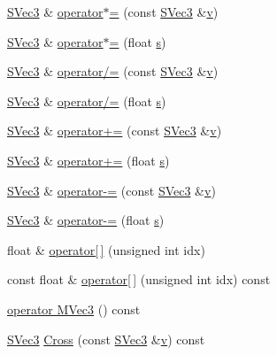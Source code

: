 \begin{CompactItemize}
\hyperlink{struct_s_vec3}{SVec3} \& \hyperlink{struct_s_vec3_4a1d77dd549c58455c0003e1445d1ad3}{operator$\ast$=} (const \hyperlink{struct_s_vec3}{SVec3} \&\hyperlink{struct_s_vec3_e77f7ec6dd4b23199dce3e4dfaee9804}{v})
\item 
\hyperlink{struct_s_vec3}{SVec3} \& \hyperlink{struct_s_vec3_eb70adcdab8bd8aa9351db18341ef6e0}{operator$\ast$=} (float \hyperlink{glext__bak_8h_d585a1393cfa368fa9dc3d8ebff640d5}{s})
\item 
\hyperlink{struct_s_vec3}{SVec3} \& \hyperlink{struct_s_vec3_9e47ed7dcdb8436f298025c3cdc8f75a}{operator/=} (const \hyperlink{struct_s_vec3}{SVec3} \&\hyperlink{struct_s_vec3_e77f7ec6dd4b23199dce3e4dfaee9804}{v})
\item 
\hyperlink{struct_s_vec3}{SVec3} \& \hyperlink{struct_s_vec3_270fb17ebc3651f2761e9ddd294e9e2d}{operator/=} (float \hyperlink{glext__bak_8h_d585a1393cfa368fa9dc3d8ebff640d5}{s})
\item 
\hyperlink{struct_s_vec3}{SVec3} \& \hyperlink{struct_s_vec3_1b2eb0d4a1f7616b3cbf3174fe4a7bcc}{operator+=} (const \hyperlink{struct_s_vec3}{SVec3} \&\hyperlink{struct_s_vec3_e77f7ec6dd4b23199dce3e4dfaee9804}{v})
\item 
\hyperlink{struct_s_vec3}{SVec3} \& \hyperlink{struct_s_vec3_907316ea6880e4b6c5816929d8f387f3}{operator+=} (float \hyperlink{glext__bak_8h_d585a1393cfa368fa9dc3d8ebff640d5}{s})
\item 
\hyperlink{struct_s_vec3}{SVec3} \& \hyperlink{struct_s_vec3_3927705cbbdba6a42b8ec8bd839b1528}{operator-=} (const \hyperlink{struct_s_vec3}{SVec3} \&\hyperlink{struct_s_vec3_e77f7ec6dd4b23199dce3e4dfaee9804}{v})
\item 
\hyperlink{struct_s_vec3}{SVec3} \& \hyperlink{struct_s_vec3_eeb11a8159ee71312203d2bab8f7c157}{operator-=} (float \hyperlink{glext__bak_8h_d585a1393cfa368fa9dc3d8ebff640d5}{s})
\item 
float \& \hyperlink{struct_s_vec3_80054be7f9f62d81c5612d69f32ba11c}{operator\mbox{[}$\,$\mbox{]}} (unsigned int idx)
\item 
const float \& \hyperlink{struct_s_vec3_200414903bec9b6bab6946b0d900dc40}{operator\mbox{[}$\,$\mbox{]}} (unsigned int idx) const 
\item 
\hyperlink{struct_s_vec3_feb6cc5887cb360146ca4add14f935dc}{operator MVec3} () const 
\item 
\hyperlink{struct_s_vec3}{SVec3} \hyperlink{struct_s_vec3_2f8cd2997092116b29bed46041e4dcc3}{Cross} (const \hyperlink{struct_s_vec3}{SVec3} \&\hyperlink{struct_s_vec3_e77f7ec6dd4b23199dce3e4dfaee9804}{v}) const 
\end{CompactItemize}
